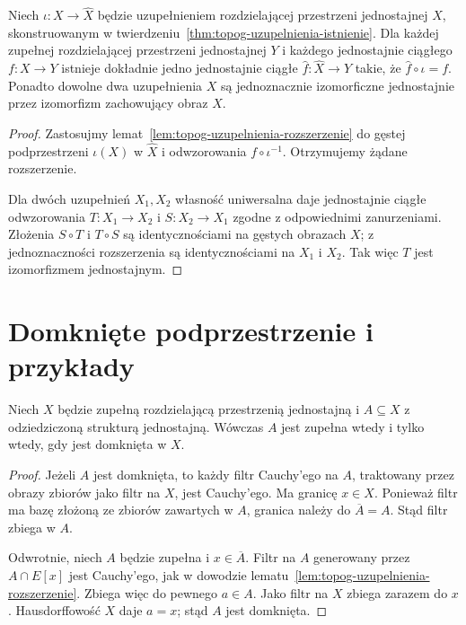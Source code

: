 \begin{twierdzenie}
\label{thm:topog-uzupelnienia-uniwersalnosc}
Niech $\iota:X\to\widehat X$ będzie
uzupełnieniem rozdzielającej przestrzeni
jednostajnej $X$, skonstruowanym
w twierdzeniu~\ref{thm:topog-uzupelnienia-istnienie}.
Dla każdej zupełnej rozdzielającej
przestrzeni jednostajnej $Y$
i każdego jednostajnie ciągłego
$f:X\to Y$ istnieje dokładnie jedno
jednostajnie ciągłe $\widehat f:\widehat X\to Y$
takie, że $\widehat f\circ\iota=f$.
Ponadto dowolne dwa uzupełnienia $X$
są jednoznacznie izomorficzne jednostajnie
przez izomorfizm zachowujący obraz $X$.
\end{twierdzenie}
\begin{proof}
Zastosujmy lemat~\ref{lem:topog-uzupelnienia-rozszerzenie}
do gęstej podprzestrzeni $\iota(X)$
w $\widehat X$ i odwzorowania
$f\circ\iota^{-1}$. Otrzymujemy
żądane rozszerzenie.

Dla dwóch uzupełnień $X_1,X_2$
własność uniwersalna daje jednostajnie
ciągłe odwzorowania
$T:X_1\to X_2$ i $S:X_2\to X_1$
zgodne z odpowiednimi zanurzeniami.
Złożenia $S\circ T$ i $T\circ S$
są identycznościami na gęstych
obrazach $X$; z jednoznaczności
rozszerzenia są identycznościami
na $X_1$ i $X_2$. Tak więc
$T$ jest izomorfizmem jednostajnym.
\end{proof}

\section{Domknięte podprzestrzenie i przykłady}
\label{sec:topog-uzupelnienia-przyklady}

\begin{twierdzenie}
\label{thm:topog-uzupelnienia-podprzestrzenie}
Niech $X$ będzie zupełną rozdzielającą
przestrzenią jednostajną i $A\subseteq X$
z odziedziczoną strukturą jednostajną.
Wówczas $A$ jest zupełna wtedy i tylko wtedy,
gdy jest domknięta w $X$.
\end{twierdzenie}
\begin{proof}
Jeżeli $A$ jest domknięta, to każdy filtr
Cauchy'ego na $A$, traktowany przez
obrazy zbiorów jako filtr na $X$,
jest Cauchy'ego. Ma granicę $x\in X$.
Ponieważ filtr ma bazę złożoną ze
zbiorów zawartych w $A$, granica należy
do $\overline A=A$.
Stąd filtr zbiega w $A$.

Odwrotnie, niech $A$ będzie zupełna
i $x\in\overline A$. Filtr na $A$
generowany przez $A\cap E[x]$ jest
Cauchy'ego, jak w dowodzie
lematu~\ref{lem:topog-uzupelnienia-rozszerzenie}.
Zbiega więc do pewnego $a\in A$.
Jako filtr na $X$ zbiega zarazem do $x$.
Hausdorffowość $X$ daje $a=x$;
stąd $A$ jest domknięta.
\end{proof}


